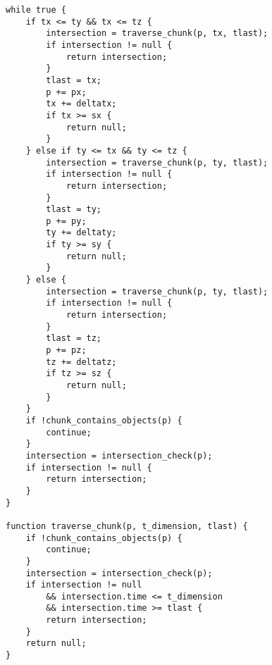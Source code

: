 \begin{verbatim}
while true {
	if tx <= ty && tx <= tz {
        intersection = traverse_chunk(p, tx, tlast);
        if intersection != null {
            return intersection;
        }
        tlast = tx;
		p += px;
		tx += deltatx;
		if tx >= sx {
            return null;
        }
	} else if ty <= tx && ty <= tz {
        intersection = traverse_chunk(p, ty, tlast);
        if intersection != null {
            return intersection;
        }
        tlast = ty;
		p += py;
		ty += deltaty;
		if ty >= sy {
            return null;
        }
	} else {
        intersection = traverse_chunk(p, ty, tlast);
        if intersection != null {
            return intersection;
        }
        tlast = tz;
		p += pz;
		tz += deltatz;
		if tz >= sz {
            return null;
        }
	}
    if !chunk_contains_objects(p) {
        continue;
    }
    intersection = intersection_check(p);
    if intersection != null {
        return intersection;
    }
}

function traverse_chunk(p, t_dimension, tlast) {
    if !chunk_contains_objects(p) {
        continue;
    }
    intersection = intersection_check(p);
    if intersection != null 
        && intersection.time <= t_dimension
        && intersection.time >= tlast {
        return intersection;
    }
    return null;
}
\end{verbatim}


